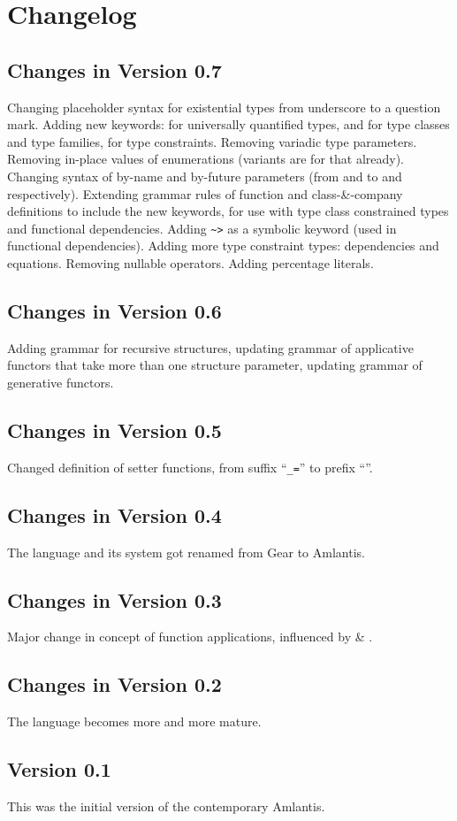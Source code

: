 
\chapter{Changelog}
\label{sec:changelog}

\section*{Changes in Version 0.7}

Changing placeholder syntax for existential types from underscore to a question mark. Adding new keywords:  for universally quantified types,  and  for type classes and type families,  for type constraints. Removing variadic type parameters. Removing in-place values of enumerations (variants are for that already). Changing syntax of by-name and by-future parameters (from \code{=>} and \code{=>>} to \code{->} and \code{->>} respectively). Extending grammar rules of function and class-\&-company definitions to include the new keywords, for use with type class constrained types and functional dependencies. Adding \lstinline!~>! as a symbolic keyword (used in functional dependencies). Adding more type constraint types: dependencies and equations. Removing nullable operators. Adding percentage literals. 

\section*{Changes in Version 0.6}

Adding grammar for recursive structures, updating grammar of applicative functors that take more than one structure parameter, updating grammar of generative functors.  

\section*{Changes in Version 0.5}

Changed definition of setter functions, from suffix ``\lstinline!_=!'' to prefix ``''. 

\section*{Changes in Version 0.4}

The language and its system got renamed from Gear to Amlantis. 

\section*{Changes in Version 0.3}

Major change in concept of function applications, influenced by  \& . 

\section*{Changes in Version 0.2}

The language becomes more and more mature.

\section*{Version 0.1}

This was the initial version of the contemporary Amlantis. 
